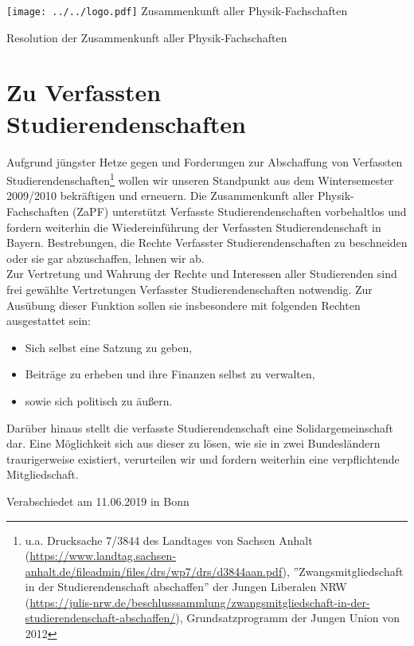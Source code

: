 \documentclass[DIV=calc]{scrartcl}
\begin{document}
    \hspace{0.87\textwidth}
    \begin{minipage}{120pt}
        \vspace{-1.8cm}
        \texttt{[image: ../../logo.pdf]}
        \centering
        \small Zusammenkunft aller Physik-Fachschaften
    \end{minipage}
    \begin{center}
        \huge{Resolution der Zusammenkunft aller Physik-Fachschaften}\vspace{.25\baselineskip}\\
        \normalsize
    \end{center}
    \vspace{0.2cm}

\section*{Zu Verfassten Studierendenschaften}
Aufgrund jüngster Hetze gegen und Forderungen zur Abschaffung von Verfassten Studierendenschaften\footnote{u.a. Drucksache 7/3844 des Landtages von Sachsen Anhalt (\url{https://www.landtag.sachsen-anhalt.de/fileadmin/files/drs/wp7/drs/d3844aan.pdf}), ''Zwangsmitgliedschaft in der Studierendenschaft abschaffen'' der Jungen Liberalen NRW (\url{https://julis-nrw.de/beschlusssammlung/zwangsmitgliedschaft-in-der-studierendenschaft-abschaffen/}), Grundsatzprogramm der Jungen Union von 2012} wollen wir unseren Standpunkt aus dem Wintersemester 2009/2010 bekräftigen und erneuern.
Die Zusammenkunft aller Physik-Fachschaften (ZaPF) unterstützt Verfasste Studierendenschaften vorbehaltlos und fordern weiterhin die Wiedereinführung der Verfassten Studierendenschaft in Bayern.
Bestrebungen, die Rechte Verfasster Studierendenschaften zu beschneiden oder sie gar abzuschaffen, lehnen wir ab.\\

Zur Vertretung und Wahrung der Rechte und Interessen aller Studierenden sind frei gewählte Vertretungen
Verfasster Studierendenschaften notwendig. Zur Ausübung dieser Funktion sollen sie insbesondere mit
folgenden Rechten ausgestattet sein:\\
\begin{itemize}
\item Sich selbst eine Satzung zu geben,
\item Beiträge zu erheben und ihre Finanzen selbst zu verwalten,
\item sowie sich politisch zu äußern.
\end{itemize}
Darüber hinaus stellt die verfasste Studierendenschaft eine Solidargemeinschaft dar. Eine Möglichkeit sich
aus dieser zu lösen, wie sie in zwei Bundesländern traurigerweise existiert, verurteilen wir und fordern
weiterhin eine verpflichtende Mitgliedschaft.\\


\vspace*{\fill}
\begin{flushright}
Verabschiedet am 11.06.2019 in Bonn
\end{flushright}
\end{document}

